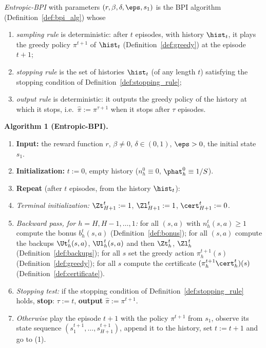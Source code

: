 \begin{definition}\label{def:entropic_bpi}
\leanok
{}
\emph{Entropic-BPI} with parameters $(r, \beta, \delta, \eps, s_1)$ is the BPI algorithm
(Definition~\ref{def:bpi_alg}) whose
\begin{enumerate}
  \item[(i)] \emph{sampling rule} is deterministic: after $t$ episodes, with history $\hist_t$, it
        plays the greedy policy $\pi^{t+1}$ of $\hist_t$ (Definition~\ref{def:greedy}) at the
        episode $t + 1$;
  \item[(ii)] \emph{stopping rule} is the set of histories $\hist_t$ (of any length $t$) satisfying
        the stopping condition of Definition~\ref{def:stopping_rule};
  \item[(iii)] \emph{output rule} is deterministic: it outputs the greedy policy of the history at
        which it stops, i.e.\ $\hat\pi := \pi^{\tau + 1}$ when it stops after $\tau$ episodes.
\end{enumerate}

\medskip\noindent\textbf{Algorithm 1 (Entropic-BPI).}
\begin{enumerate}
  \item[] \textbf{Input:} the reward function $r$, $\beta \ne 0$, $\delta \in (0, 1)$, $\eps > 0$, the
        initial state $s_1$.
  \item[] \textbf{Initialization:} $t := 0$, empty history ($n_h^0 \equiv 0$, $\phat_h^0 \equiv 1/S$).
  \item[] \textbf{Repeat} (after $t$ episodes, from the history $\hist_t$):
  \item[(1)] \emph{Terminal initialization:} $\Zt^t_{H+1} := 1$, $\Zl^t_{H+1} := 1$, $\cert^t_{H+1} := 0$.
  \item[(2)] \emph{Backward pass, for $h = H, H - 1, \dots, 1$:} for all $(s, a)$ with $n_h^t(s, a) \ge 1$
        compute the bonus $b_h^t(s, a)$ (Definition~\ref{def:bonus}); for all $(s, a)$ compute the
        backups $\Ut^t_h(s, a)$, $\Ul^t_h(s, a)$ and then $\Zt^t_h$, $\Zl^t_h$
        (Definition~\ref{def:backups}); for all $s$ set the greedy action $\pi^{t+1}_h(s)$
        (Definition~\ref{def:greedy}); for all $s$ compute the certificate $(\pi^{t+1}_h\cert^t_h)(s)$
        (Definition~\ref{def:certificate}).
  \item[(3)] \emph{Stopping test:} if the stopping condition of Definition~\ref{def:stopping_rule}
        holds, \textbf{stop}: $\tau := t$, \textbf{output} $\hat\pi := \pi^{t+1}$.
  \item[(4)] \emph{Otherwise} play the episode $t + 1$ with the policy $\pi^{t+1}$ from $s_1$,
        observe its state sequence $(s^{t+1}_1, \dots, s^{t+1}_{H+1})$, append it to the history,
        set $t := t + 1$ and go to (1).
\end{enumerate}
\end{definition}

